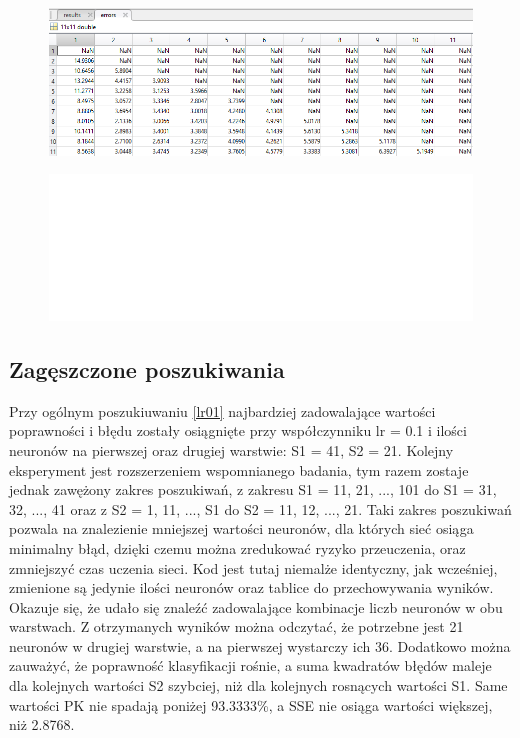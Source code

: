 \documentclass[a4paper, 12pt]{report}
\begin{document}
\begin{figure}[hbt!]
\includegraphics[width=14cm]{lr5 sse dane}
\centering
\end{figure}

\begin{figure}[hbt!]
\includegraphics[width=22cm]{puste}
\centering
\end{figure}
  

\newpage
\subsection{Zagęszczone poszukiwania}\label{zageszczone}
Przy ogólnym poszukiuwaniu \ref{lr01} najbardziej zadowalające wartości poprawności i błędu zostały osiągnięte przy współczynniku lr = 0.1 i ilości neuronów na pierwszej oraz drugiej warstwie: S1 = 41, S2 = 21. Kolejny eksperyment jest rozszerzeniem wspomnianego badania, tym razem zostaje jednak zawężony zakres poszukiwań, z zakresu S1 = 11, 21, ..., 101 do S1 = 31, 32, ..., 41 oraz z S2 = 1, 11, ..., S1 do  S2 = 11, 12, ..., 21. Taki zakres poszukiwań pozwala na znalezienie mniejszej wartości neuronów, dla których sieć osiąga minimalny błąd, dzięki czemu można zredukować ryzyko przeuczenia, oraz zmniejszyć czas uczenia sieci. Kod jest tutaj niemalże identyczny, jak wcześniej, zmienione są jedynie ilości neuronów oraz tablice do przechowywania wyników.
Okazuje się, że udało się znaleźć zadowalające kombinacje liczb neuronów w obu warstwach. Z otrzymanych wyników można odczytać, że potrzebne jest 21 neuronów w drugiej warstwie, a na pierwszej wystarczy ich 36. Dodatkowo można zauważyć, że poprawność klasyfikacji rośnie, a suma kwadratów błędów maleje dla kolejnych wartości S2 szybciej, niż dla kolejnych rosnących wartości S1. Same wartości PK nie spadają poniżej 93.3333\%, a SSE nie osiąga wartości większej, niż 2.8768.
\end{document}
